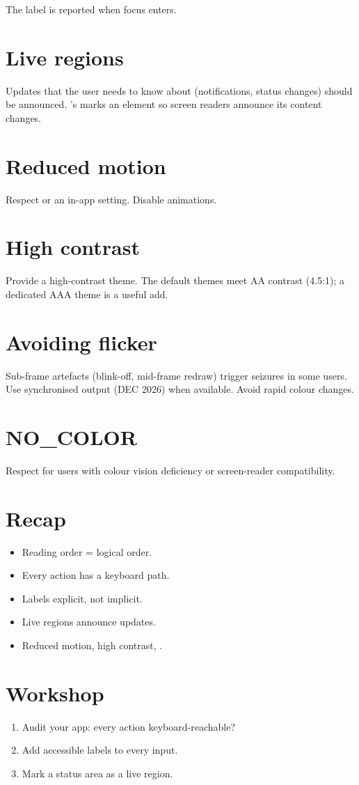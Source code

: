 The label is reported when focus enters.

\section{Live regions}

Updates that the user needs to know about (notifications,
status changes) should be announced. \maya{}'s
 marks an element so screen readers
announce its content changes.

\section{Reduced motion}

Respect  or an in-app
setting. Disable animations.

\section{High contrast}

Provide a high-contrast theme. The default themes meet AA
contrast (4.5:1); a dedicated AAA theme is a useful add.

\section{Avoiding flicker}

Sub-frame artefacts (blink-off, mid-frame redraw) trigger
seizures in some users. Use synchronised output (DEC 2026)
when available. Avoid rapid colour changes.

\section{NO\_COLOR}

Respect  for users with colour vision
deficiency or screen-reader compatibility.

\section{Recap}

\begin{recap}
\begin{itemize}[leftmargin=*]
  \item Reading order = logical order.
  \item Every action has a keyboard path.
  \item Labels explicit, not implicit.
  \item Live regions announce updates.
  \item Reduced motion, high contrast, .
\end{itemize}
\end{recap}

\section*{Workshop}

\begin{enumerate}[leftmargin=*]
  \item Audit your app: every action keyboard-reachable?
  \item Add accessible labels to every input.
  \item Mark a status area as a live region.
\end{enumerate}
